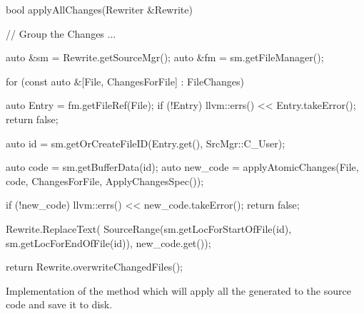 \begin{listing}[H]
    \begin{cppcode}
bool applyAllChanges(Rewriter &Rewrite) {
    // Group the Changes
    ...

    auto &sm = Rewrite.getSourceMgr();
    auto &fm = sm.getFileManager();

    for (const auto &[File, ChangesForFile] : FileChanges) {
        auto Entry = fm.getFileRef(File); 
        if (!Entry) {
            llvm::errs() << Entry.takeError();
            return false;
        }

        auto id = sm.getOrCreateFileID(Entry.get(), SrcMgr::C_User);

        auto code = sm.getBufferData(id);
        auto new_code = applyAtomicChanges(File, code, ChangesForFile, ApplyChangesSpec());

        if (!new_code) {
            llvm::errs() << new_code.takeError();
            return false;
        }

        Rewrite.ReplaceText(
            SourceRange(sm.getLocForStartOfFile(id), sm.getLocForEndOfFile(id)), new_code.get());
    }
    
    return Rewrite.overwriteChangedFiles();
}
    \end{cppcode}
    \caption{Implementation of the  method which will apply all the generated  to the source code and save it to disk.}
    \label{code:085tool_ex:030cstyle:apply_changes}
\end{listing}





